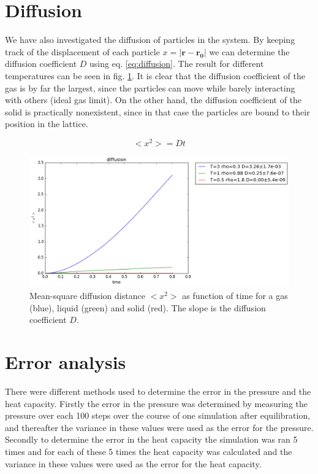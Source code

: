 \documentclass[12pt,a4paper]{report}
\begin{document}
\section{Diffusion}

We have also investigated the diffusion of particles in the system.
By keeping track of the displacement of each particle $x = |\mathbf{r}-\mathbf{r_0}|$ we can determine the diffusion coefficient $D$ using eq. \ref{eq:diffusion}. The result for different temperatures can be seen in fig. \ref{fig:diffusion}. It is clear that the diffusion coefficient of the gas is by far the largest, since the particles can move while barely interacting with others (ideal gas limit). On the other hand, the diffusion coefficient of the solid is practically nonexistent, since in that case the particles are bound to their position in the lattice.

\begin{equation}\label{eq:diffusion}
	<x^2> = D t
\end{equation}

\begin{figure}[H]
\centering
\includegraphics[scale=0.5]{diffusion.png}
\caption{Mean-square diffusion distance $<x^2>$ as function of time for a gas (blue), liquid (green) and solid (red). The slope is the diffusion coefficient $D$.}
\label{fig:diffusion}
\end{figure}

\section{Error analysis}

There were different methods used to determine the error in the pressure and the heat capacity. Firstly the error in the pressure was determined by measuring the pressure over each 100 steps over the course of one simulation after equilibration, and thereafter the variance in these values were used as the error for the pressure. Secondly to determine the error in the heat capacity the simulation was ran 5 times and for each of these 5 times the heat capacity was calculated and the variance in these values were used as the error for the heat capacity.
\end{document}
